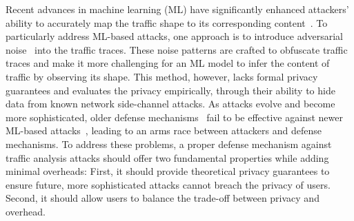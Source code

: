 Recent advances in machine learning (ML) have significantly enhanced attackers' ability to accurately map the traffic shape to its corresponding content~\cite{schuster2017beautyburst, bhat2019varcnn, sirinam2018df}.
To particularly address ML-based attacks, one approach is to introduce adversarial noise~\cite{shan2021dolos, nasr2021blind, rahman2020mockingbird} into the traffic traces.
These noise patterns are crafted to obfuscate traffic traces and make it more challenging for an ML model to infer the content of traffic by observing its shape. 
This method, however, lacks formal privacy guarantees and evaluates the privacy empirically, through their ability to hide data from known network side-channel attacks.
As attacks evolve and become more sophisticated, older defense mechanisms~\cite{wang2017walkie,cai2014csbuflo} fail to be effective against newer ML-based attacks~\cite{sirinam2018df}, leading to an arms race between attackers and defense mechanisms.
To address these problems, a proper defense mechanism against traffic analysis attacks should offer two fundamental properties while adding minimal overheads: 
First, it should provide theoretical privacy guarantees to ensure future, more sophisticated attacks cannot breach the privacy of users.
Second, it should allow users to balance the trade-off between privacy and overhead.





